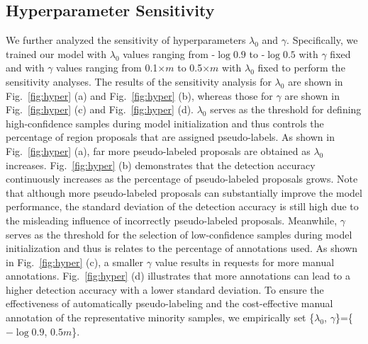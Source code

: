 \documentclass[journal]{IEEEtran}
\begin{document}
{\subsection{Hyperparameter Sensitivity}
We further analyzed the sensitivity of hyperparameters $\lambda_0$ and $\gamma$. Specifically, we trained our model with $\lambda_0$ values ranging from -$\log 0.9$ to -$\log 0.5$ with $\gamma$ fixed and with $\gamma$ values ranging from 0.1$\times m$ to 0.5$\times m$ with $\lambda_0$ fixed to perform the sensitivity analyses. The results of the sensitivity analysis for $\lambda_0$ are shown in Fig.~\ref{fig:hyper} (a) and Fig.~\ref{fig:hyper} (b), whereas those for $\gamma$  are shown in Fig.~\ref{fig:hyper} (c) and Fig.~\ref{fig:hyper} (d). $\lambda_0$ serves as the threshold for defining high-confidence samples during model initialization and thus controls the percentage of region proposals that are assigned pseudo-labels. As shown in Fig.~\ref{fig:hyper} (a), far more pseudo-labeled proposals are obtained as $\lambda_0$ increases. Fig.~\ref{fig:hyper} (b) demonstrates that the detection accuracy continuously increases as the percentage of pseudo-labeled proposals grows. Note that although more pseudo-labeled proposals can substantially improve the model performance, the standard deviation of the detection accuracy is still high due to the misleading influence of incorrectly pseudo-labeled proposals. Meanwhile, $\gamma$ serves as the threshold for the selection of low-confidence samples during model initialization and thus is relates to the percentage of annotations used. As shown in Fig.~\ref{fig:hyper} (c), a smaller $\gamma$ value results in requests for more manual annotations. Fig.~\ref{fig:hyper} (d) illustrates that more annotations can lead to a higher detection accuracy with a lower standard deviation. To ensure the {effectiveness of automatically pseudo-labeling} and the cost-effective manual annotation of the representative minority samples, we empirically set \{$\lambda_0$, $\gamma$\}=\{$-\log 0.9$, $0.5m$\}. 




}
\end{document}
